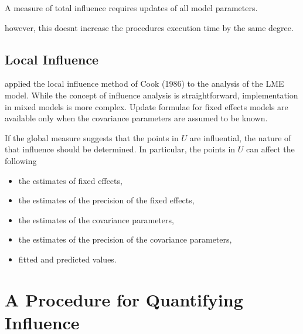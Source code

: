 \documentclass[Main.tex]{subfiles}
\begin{document}
A measure of total influence requires updates of all model parameters.


however, this doesnt increase the procedures execution time by the same degree.

\newpage




			
				

		
		


		
	
		\subsection{Local Influence}
		\citet{Beckman} applied the local influence method of Cook (1986) to the analysis of the LME model.
		While the concept of influence analysis is straightforward, implementation in mixed models is more complex. Update formulae for fixed effects models are available only when the covariance parameters are assumed to be known.
		
		If the global measure suggests that the points in $U$ are influential, the nature of that influence should be determined. In particular, the points in $U$ can affect the following
		
		\begin{itemize}
			\item the estimates of fixed effects,
			\item the estimates of the precision of the fixed effects,
			\item the estimates of the covariance parameters,
			\item the estimates of the precision of the covariance parameters,
			\item fitted and predicted values.
		\end{itemize}
	
		

		
			
			
			
\newpage		
			\section{A Procedure for Quantifying Influence}  %
\end{document}
